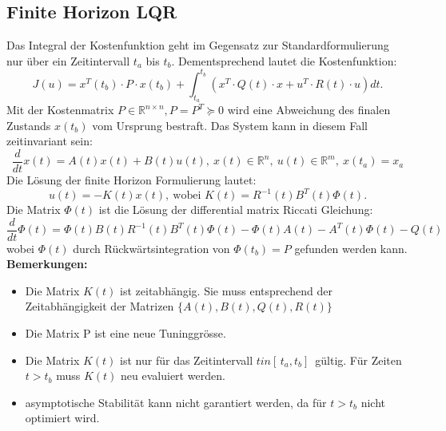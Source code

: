 \subsection{Finite Horizon LQR}
Das Integral der Kostenfunktion geht im Gegensatz zur Standardformulierung nur über ein Zeitintervall $t_a$ bis $t_b$. Dementsprechend lautet die Kostenfunktion:
\[J(u) = x^T(t_b)\cdot P \cdot x(t_b) + \int_{t_a}^{t_b}(x^T\cdot Q(t)\cdot x+u^T\cdot R(t)\cdot u) dt.\]
Mit der Kostenmatrix $ P \in \mathbb{R}^{n \times n}, P = P^T \succeq 0$ wird eine Abweichung des finalen Zustands $ x(t_b)$ vom Ursprung bestraft. Das System kann in diesem Fall zeitinvariant sein: \[\frac{d}{dt}x(t) = A(t)x(t)+B(t)u(t),\ x(t) \in \mathbb{R}^n,\ u(t) \in \mathbb{R}^m,\ x(t_a)=x_a\]
Die Lösung der finite Horizon Formulierung lautet:
\[u(t) = -K(t)x(t),\ \text{wobei } K(t)=R^{-1}(t)B^T(t)\Phi(t).\]
Die Matrix  $\Phi(t)$ ist die Lösung der differential matrix Riccati Gleichung:
\[\frac{d}{dt}\Phi(t)=\Phi(t)B(t)R^{-1}(t)B^T(t)\Phi(t) -\Phi(t)A(t)-A^T(t)\Phi(t)-Q(t)\]
wobei $\Phi(t)$ durch Rückwärtsintegration von $\Phi(t_b) = P$ gefunden werden kann.
\textbf{Bemerkungen:}
\begin{itemize}
    \item Die Matrix $K(t)$ ist zeitabhängig. Sie muss entsprechend der Zeitabhängigkeit der Matrizen $\{A(t),B(t),Q(t),R(t)\}$
    \item Die Matrix P ist eine neue Tuninggrösse.
    \item Die Matrix $K(t)$ ist nur für das Zeitintervall $ t in [\,t_a,t_b]\,$ gültig. Für Zeiten $t > t_b$ muss $K(t)$ neu evaluiert werden.
    \item asymptotische Stabilität kann nicht garantiert werden, da für $t>t_b$ nicht optimiert wird.
\end{itemize}
